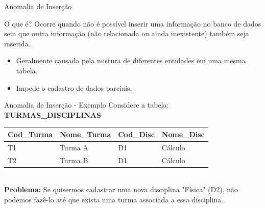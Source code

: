 \documentclass[9pt]{beamer}
\begin{document}
\begin{frame}{Anomalia de Inserção}
  \begin{block}{O que é?}
    Ocorre quando não é possível inserir uma informação no banco de dados sem que outra informação (não relacionada ou ainda inexistente) também seja inserida.
  \end{block}
  \begin{itemize}
    \item Geralmente causada pela mistura de diferentes entidades em uma mesma tabela.
    \item Impede o cadastro de dados parciais.
  \end{itemize}
\end{frame}
\begin{frame}{Anomalia de Inserção - Exemplo}
  Considere a tabela: \textbf{TURMAS\_DISCIPLINAS}
  \vspace{0.3cm}
  \begin{small}
  \begin{tabular}{|l|l|l|l|}
    \hline
    \textbf{Cod\_Turma} & \textbf{Nome\_Turma} & \textbf{Cod\_Disc} & \textbf{Nome\_Disc} \\ \hline
    T1 & Turma A & D1 & Cálculo \\ \hline
    T2 & Turma B & D1 & Cálculo \\ \hline
  \end{tabular}
  \end{small}\\
  
  \textbf{Problema:} Se quisermos cadastrar uma nova disciplina "Física" (D2), não podemos fazê-lo até que exista uma turma associada a essa disciplina.
\end{frame}
\end{document}
